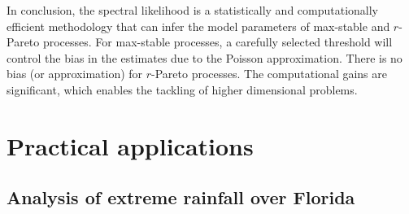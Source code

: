 \documentclass[12pt]{article}
\begin{document}
In conclusion, 
the spectral likelihood is a statistically and computationally efficient methodology that can infer the model parameters of max-stable and $r$-Pareto processes. 
For max-stable processes, a carefully selected threshold 
will 
control the bias in the estimates due to the Poisson approximation.
There is no bias (or approximation) for $r$-Pareto processes.
The computational gains are significant, which enables the tackling of higher dimensional problems.

\section{Practical applications}
\label{sec:real}

\subsection{Analysis of extreme rainfall over Florida}
\end{document}
